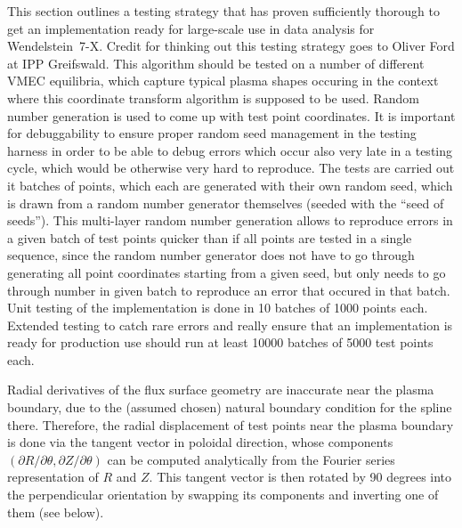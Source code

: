 %
This section outlines a testing strategy that has proven sufficiently thorough
to get an implementation ready for large-scale use in data analysis for Wendelstein~7-X.
%
Credit for thinking out this testing strategy goes to Oliver Ford at IPP Greifswald.
%
This algorithm should be tested on a number of different VMEC equilibria,
which capture typical plasma shapes occuring in the context
where this coordinate transform algorithm is supposed to be used.
%
Random number generation is used to come up with test point coordinates.
%
It is important for debuggability to ensure proper random seed management
in the testing harness in order to be able to debug errors which occur also very late in a testing cycle,
which would be otherwise very hard to reproduce.
%
The tests are carried out it batches of points,
which each are generated with their own random seed,
which is drawn from a random number generator themselves (seeded with the ``seed of seeds'').
%
This multi-layer random number generation allows to reproduce errors
in a given batch of test points quicker than if all points are tested in a single sequence,
since the random number generator does not have to go through generating
all point coordinates starting from a given seed,
but only needs to go through number in given batch
to reproduce an error that occured in that batch.
%
Unit testing of the implementation is done in 10 batches of 1000 points each.
%
Extended testing to catch rare errors and really ensure that an implementation
is ready for production use should run at least 10000 batches of 5000 test points each.

Radial derivatives of the flux surface geometry are inaccurate near the plasma boundary,
due to the (assumed chosen) natural boundary condition for the spline there.
%
Therefore, the radial displacement of test points near the plasma boundary
is done via the tangent vector in poloidal direction,
whose components $(\partial R / \partial \theta, \partial Z / \partial \theta)$
can be computed analytically from the Fourier series representation of $R$ and $Z$.
%
This tangent vector is then rotated by 90 degrees into the perpendicular orientation
by swapping its components and inverting one of them (see below).

